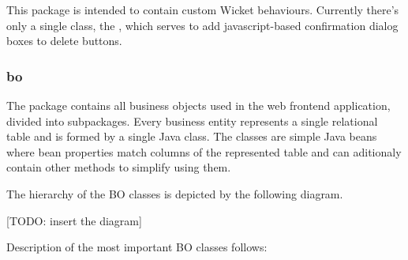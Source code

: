 This package is intended to contain custom Wicket behaviours. Currently there's only a single class, the , which serves to add javascript-based confirmation dialog boxes to delete buttons.

\subsubsection{bo}

The  package contains all business objects used in the web frontend application, divided into subpackages. Every business entity represents a single relational table and is formed by a single Java class. The classes are simple Java beans where bean properties match columns of the represented table and can aditionaly contain other methods to simplify using them.

The hierarchy of the BO classes is depicted by the following diagram.

[TODO: insert the diagram]

Description of the most important BO classes follows:

